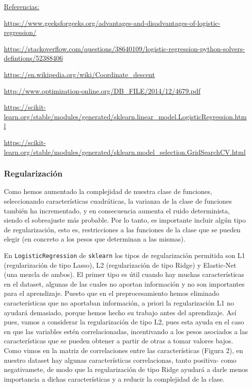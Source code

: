 \documentclass[a4]{article}
\begin{document}
\underline{Referencias:}

\href{https://www.geeksforgeeks.org/advantages-and-disadvantages-of-logistic-regression/}{https://www.geeksforgeeks.org/advantages-and-disadvantages-of-logistic-regression/}

\href{https://stackoverflow.com/questions/38640109/logistic-regression-python-solvers-defintions/52388406}{https://stackoverflow.com/questions/38640109/logistic-regression-python-solvers-defintions/52388406}

\href{https://en.wikipedia.org/wiki/Coordinate_descent}{https://en.wikipedia.org/wiki/Coordinate\_descent}

\href{http://www.optimization-online.org/DB_FILE/2014/12/4679.pdf}{http://www.optimization-online.org/DB\_FILE/2014/12/4679.pdf}

\href{https://scikit-learn.org/stable/modules/generated/sklearn.linear_model.LogisticRegression.html}{https://scikit-learn.org/stable/modules/generated/sklearn.linear\_model.LogisticRegression.html}

\href{https://scikit-learn.org/stable/modules/generated/sklearn.model_selection.GridSearchCV.html}{https://scikit-learn.org/stable/modules/generated/sklearn.model\_selection.GridSearchCV.html}

\subsubsection{Regularización}

Como hemos aumentado la complejidad de nuestra clase de funciones, seleccionando características cuadráticas, la varianza de la clase de funciones también ha incrementado, y en consecuencia aumenta el ruido determinista, siendo el sobreajuste más probable. Por lo tanto, es importante incluir algún tipo de regularización, esto es, restricciones a las funciones de la clase que se pueden elegir (en concreto a los pesos que determinan a las mismas).

En \lstinline|LogisticRegression| de \lstinline|sklearn| los tipos de regularización permitida son L1 (regularización de tipo Lasso), L2 (regularización de tipo Ridge) y Elastic-Net (una mezcla de ambos). El primer tipo es útil cuando hay muchas características en el dataset, algunas de las cuales no aportan información y no son importantes para el aprendizaje. Puesto que en el preprocesamiento hemos eliminado características que no aportaban información, a priori la regularización L1 no ayudará demasiado, porque hemos hecho su trabajo antes del aprendizaje. Así pues, vamos a considerar la regularización de tipo L2, pues esta ayuda en el caso en que las variables estén correlacionadas, incentivando a los pesos asociados a las características que se pueden obtener a partir de otras a tomar valores bajos. Como vimos en la matriz de correlaciones entre las características (Figura 2), en nuestro dataset hay algunas características correlacionas, tanto positiva- como negativamete, de modo que la regularización de tipo Ridge ayudará a darle menos importancia a dichas características y a reducir la complejidad de la clase. 
\end{document}
